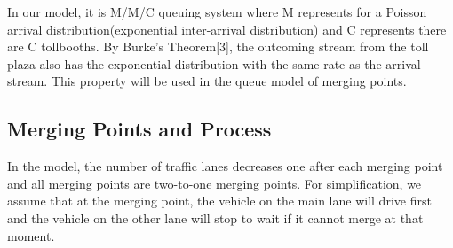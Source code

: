 \noindent
In our model, it is M/M/C queuing system where M represents for a Poisson arrival distribution(exponential inter-arrival distribution) and C represents there are C tollbooths. By Burke's Theorem[3], the outcoming stream from the toll plaza also has the exponential distribution with the same rate as the arrival stream. This property will be used in the queue model of merging points.

\subsection{Merging Points and Process}
In the model, the number of traffic lanes decreases one after each merging point and all merging points are two-to-one merging points. For simplification, we assume that at the merging point, the vehicle on the main lane will drive first and the vehicle on the other lane will stop to wait if it cannot merge at that moment.

